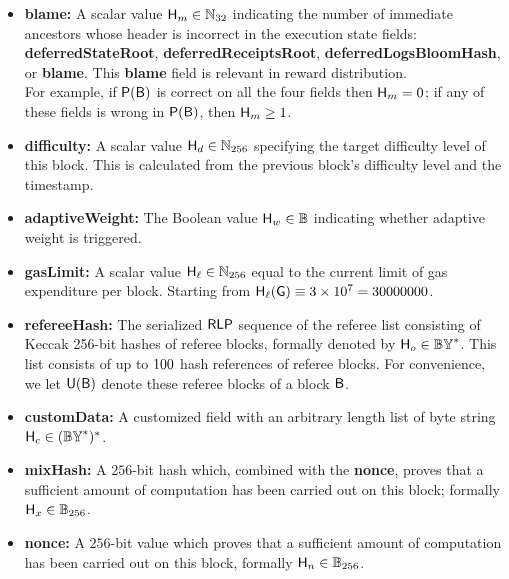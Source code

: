 \begin{itemize}[nosep]
	\item {\bf blame:} A scalar value $\textsf{H}_{m}\in\mathbb{N}_{32}$ indicating the number of immediate ancestors whose header is incorrect in the execution state fields: {\bf deferredStateRoot}, {\bf deferredReceiptsRoot}, {\bf deferredLogsBloomHash}, or {\bf blame}. 
	This {\bf blame} field is relevant in reward distribution.\\
	For example, if $\mathsf{P}{\left({\textsf{B}} \right)}$ is correct on all the four fields then $\textsf{H}_{m}=0$; if any of these fields is wrong in $\mathsf{P}{\left({\textsf{B}} \right)}$, then $\textsf{H}_{m} \ge 1$.


	\item {\bf difficulty:} A scalar value $\textsf{H}_d\in\mathbb{N}_{256}$ specifying the target difficulty level of this block. This is calculated from the previous block's difficulty level and the timestamp.


	\item {\bf adaptiveWeight:} The Boolean value $\textsf{H}_w\in\mathbb{B}$ indicating whether adaptive weight is triggered.

	\item {\bf gasLimit:} A scalar value $\textsf{H}_{\ell}\in\mathbb{N}_{256}$ equal to the current limit of gas expenditure per block. 
	Starting from $\textsf{H}_{\ell}(\textsf{G})\equiv 3\times 10^7=30000000$.

	\item {\bf refereeHash:} The serialized $\mathsf{RLP}$ sequence of the referee list consisting of  Keccak 256-bit hashes of referee blocks, formally denoted by $\textsf{H}_o \in\mathbb{BY}^*$. 
	This list consists of up to $100$ hash references of referee blocks.
	For convenience, we let $\textsf{U}(\textsf{B})$ denote these referee blocks of a block $\textsf{B}$.
	
	\item {\bf customData:} A customized field with an arbitrary length list of byte string $\textsf{H}_c\in (\mathbb{BY}^*)^*$. 

	\item {\bf mixHash:} A $256$-bit hash which, combined with the {\bf nonce}, proves that a sufficient amount of computation has been carried out on this block; formally $\textsf{H}_x\in\mathbb{B}_{256}$. 

	\item {\bf nonce:} A $256$-bit value which
	proves that a sufficient amount of computation has been carried out on this block, formally $\textsf{H}_n\in\mathbb{B}_{256}$.


\end{itemize}

